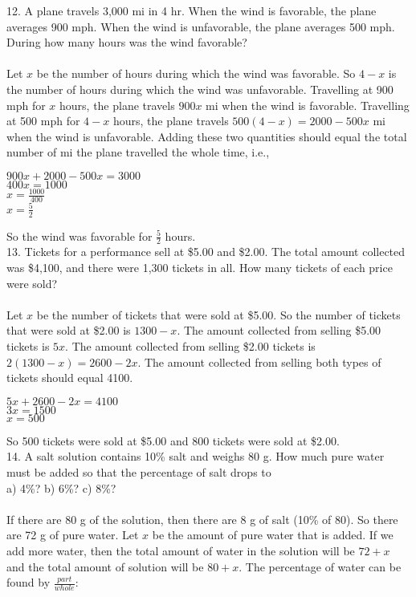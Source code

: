 \documentclass[12pt]{article}
\begin{document}
12. A plane travels 3,000 mi in 4 hr. When the wind is favorable, the plane averages 900 mph. When the wind is unfavorable, the plane averages 500 mph. During how many hours was the wind favorable? \\
\\
Let $x$ be the number of hours during which the wind was favorable. So $4-x$ is the number of hours during which the wind was unfavorable. Travelling at 900 mph for $x$ hours, the plane travels $900x$ mi when the wind is favorable. Travelling at 500 mph for $4-x$ hours, the plane travels $500(4-x)=2000-500x$ mi when the wind is unfavorable. Adding these two quantities should equal the total number of mi the plane travelled the whole time, i.e.,
\begin{center}
$900x+2000-500x=3000$ \\
$400x=1000$ \\
$x=\displaystyle \frac{1000}{400}$ \\
$x=\displaystyle \frac{5}{2}$
\end{center}
So the wind was favorable for $\displaystyle \frac{5}{2}$ hours. \\
13. Tickets for a performance sell at \$5.00 and \$2.00. The total amount collected was \$4,100, and there were 1,300 tickets in all. How many tickets of each price were sold? \\
\\
Let $x$ be the number of tickets that were sold at \$5.00. So the number of tickets that were sold at \$2.00 is $1300-x$. The amount collected from selling \$5.00 tickets is $5x$. The amount collected from selling \$2.00 tickets is $2(1300-x)=2600-2x$. The amount collected from selling both types of tickets should equal 4100.
\begin{center}
$5x+2600-2x=4100$ \\
$3x=1500$ \\
$x=500$
\end{center}
So 500 tickets were sold at \$5.00 and 800 tickets were sold at \$2.00. \\
14. A salt solution contains 10\% salt and weighs 80 g. How much pure water must be added so that the percentage of salt drops to \\
a) 4\%? \hspace{4cm} b) 6\%? \hspace{4cm} c) 8\%? \\
\\
If there are 80 g of the solution, then there are 8 g of salt (10\% of 80). So there are 72 g of pure water. Let $x$ be the amount of pure water that is added. If we add more water, then the total amount of water in the solution will be $72+x$ and the total amount of solution will be $80+x$. The percentage of water can be found by $\displaystyle \frac{part}{whole}$:
\end{document}
